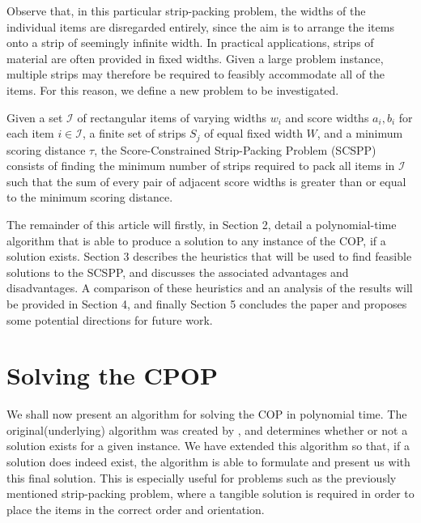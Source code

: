 \documentclass[oribibl]{llncs}
\begin{document}
Observe that, in this particular strip-packing problem, the widths of the individual items are disregarded entirely, since the aim is to arrange the items onto a strip of seemingly infinite width. In practical applications, strips of material are often provided in fixed widths. Given a large problem instance, multiple strips may therefore be required to feasibly accommodate all of the items. For this reason, we define a new problem to be investigated.

\begin{definition}
	\label{defn:scspp}
	Given a set $\mathcal{I}$ of rectangular items of varying widths $w_i$ and score widths $a_i, b_i$ for each item $i \in \mathcal{I}$, a finite set of strips $S_j$ of equal fixed width $W$, and a minimum scoring distance $\tau$, the Score-Constrained Strip-Packing Problem (SCSPP) consists of finding the minimum number of strips required to pack all items in $\mathcal{I}$ such that the sum of every pair of adjacent score widths is greater than or equal to the minimum scoring distance.
\end{definition}

The remainder of this article will firstly, in Section 2, detail a polynomial-time algorithm that is able to produce a solution to any instance of the COP, if a solution exists. Section 3 describes the heuristics that will be used to find feasible solutions to the SCSPP, and discusses the associated advantages and disadvantages. A comparison of these heuristics and an analysis of the results will be provided in Section 4, and finally Section 5 concludes the paper and proposes some potential directions for future work.


\section{Solving the CPOP}
\label{sec:ahca}

We shall now present an algorithm for solving the COP in polynomial time. The original(underlying) algorithm was created by \cite{becker2010}, and determines whether or not a solution exists for a given instance. We have extended this algorithm so that, if a solution does indeed exist, the algorithm is able to formulate and present us with this final solution. This is especially useful for problems such as the previously mentioned strip-packing problem, where a tangible solution is required in order to place the items in the correct order and orientation.
\end{document}
